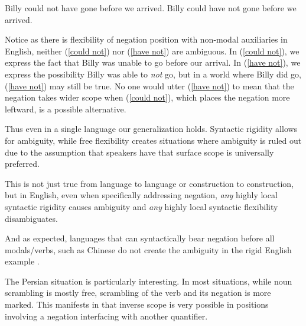 \documentclass{article}
\begin{document}
\begin{exe}
\ex Billy could not have gone before we arrived.\label{could not}
\ex Billy could have not gone before we arrived.\label{have not}
\end{exe}

Notice as there is flexibility of negation position with non-modal auxiliaries in English, neither (\ref{could not}) nor (\ref{have not}) are ambiguous. In (\ref{could not}), we express the fact that Billy was unable to go before our arrival. In (\ref{have not}), we express the possibility Billy was able to \emph{not} go, but in a world where Billy did go, (\ref{have not}) may still be true.
No one would utter (\ref{have not}) to mean that the negation takes wider scope when (\ref{could not}), which places the negation more leftward, is a possible alternative.


Thus even in a single language our generalization holds.
Syntactic rigidity allows for ambiguity, while free flexibility creates situations where ambiguity is ruled out due to the assumption that speakers have that surface scope is universally preferred.

This is not just true from language to language or construction to construction, but in English, even when specifically addressing negation, \emph{any} highly local syntactic rigidity causes ambiguity and \emph{any} highly local syntactic flexibility disambiguates.

And as expected, languages that can syntactically bear negation before all modals/verbs, such as Chinese do not create the ambiguity in the rigid English example \parencite{ernst98}.

\begin{exe}
\end{exe}

The Persian situation is particularly interesting. In most situations, while noun scrambling is mostly free, scrambling of the verb and its negation is more marked. This manifests in that inverse scope is very possible in positions involving a negation interfacing with another quantifier.
\end{document}
